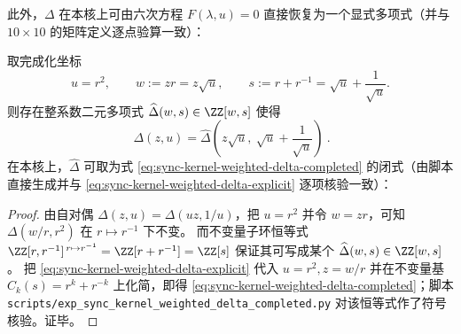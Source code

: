 此外，\(\Delta\) 在本核上可由六次方程 \(F(\lambda,u)=0\) 直接恢复为一个显式多项式（并与 \(10\times 10\) 的矩阵定义逐点验算一致）：

\begin{proposition}[完成化行列式的二元闭式：\texorpdfstring{$\Delta(z,u)=\widehat\Delta(w,s)$}{Delta=hatDelta}]\label{prop:sync-kernel-weighted-hat-delta}
取完成化坐标
\[
u=r^2,\qquad w:=zr=z\sqrt{u},\qquad s:=r+r^{-1}=\sqrt{u}+\frac{1}{\sqrt{u}}.
\]
则存在整系数二元多项式 \(\widehat\Delta(w,s)\in\ZZ[w,s]\) 使得
\[
\boxed{\ \Delta(z,u)=\widehat\Delta\!\left(z\sqrt{u},\ \sqrt{u}+\frac{1}{\sqrt{u}}\right)\ }.
\]
在本核上，\(\widehat\Delta\) 可取为式 \eqref{eq:sync-kernel-weighted-delta-completed} 的闭式（由脚本直接生成并与 \eqref{eq:sync-kernel-weighted-delta-explicit} 逐项核验一致）：

\end{proposition}
\begin{proof}
由自对偶 \(\Delta(z,u)=\Delta(uz,1/u)\)，把 \(u=r^2\) 并令 \(w=zr\)，可知
\(
\Delta(w/r,r^2)
\)
在 \(r\mapsto r^{-1}\) 下不变。
而不变量子环恒等式
\(
\ZZ[r,r^{-1}]^{\,r\mapsto r^{-1}}=\ZZ[r+r^{-1}]=\ZZ[s]
\)
保证其可写成某个 \(\widehat\Delta(w,s)\in\ZZ[w,s]\)。
把 \eqref{eq:sync-kernel-weighted-delta-explicit} 代入 \(u=r^2,z=w/r\) 并在不变量基 \(C_k(s)=r^k+r^{-k}\) 上化简，即得 \eqref{eq:sync-kernel-weighted-delta-completed}；脚本 \texttt{scripts/exp\_sync\_kernel\_weighted\_delta\_completed.py} 对该恒等式作了符号核验。证毕。
\end{proof}
